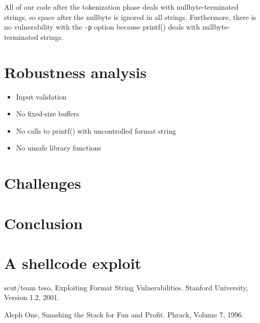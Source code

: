 \documentclass[12pt]{article}
\begin{document}
All of our code after the tokenization phase deals with nullbyte-terminated strings, so space after the nullbyte is ignored in all strings. Furthermore, there is no vulnerability with the \texttt{-p} option because printf() deals with nullbyte-terminated strings.



\section{Robustness analysis}
\begin{itemize}
  \item Input validation
  \item No fixed-size buffers
  \item No calls to printf() with uncontrolled format string
  \item No unsafe library functions
\end{itemize}

\section{Challenges}

\section{Conclusion}

\appendix
\section{A shellcode exploit}

\begin{thebibliography}{9}

  scut/team teso,
  Exploiting Format String Vulnerabilities.
  Stanford University,
  Version 1.2,
  2001.

  Aleph One,
  Smashing the Stack for Fun and Profit.
  Phrack,
  Volume 7,
  1996.
\end{thebibliography}
\end{document}
